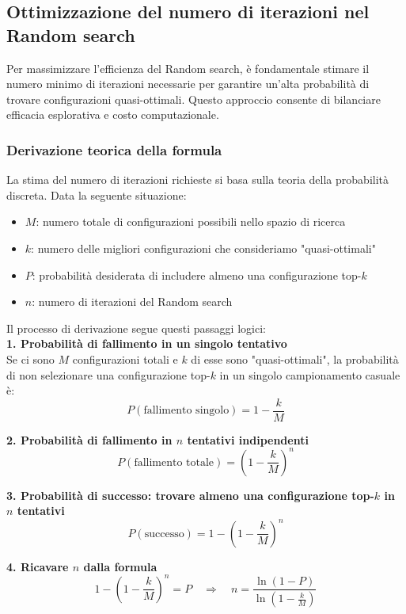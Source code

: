 \documentclass[a4paper,12pt]{report}
\begin{document}
	\subsection{Ottimizzazione del numero di iterazioni nel Random search}
	Per massimizzare l'efficienza del Random search, è fondamentale stimare il numero minimo di iterazioni necessarie per garantire un'alta probabilità di trovare configurazioni quasi-ottimali. Questo approccio consente di bilanciare efficacia esplorativa e costo computazionale.
	
	\subsubsection{Derivazione teorica della formula}
	La stima del numero di iterazioni richieste si basa sulla teoria della probabilità discreta. Data la seguente situazione:
	\begin{itemize}
		\item $M$: numero totale di configurazioni possibili nello spazio di ricerca
		\item $k$: numero delle migliori configurazioni che consideriamo "quasi-ottimali"
		\item $P$: probabilità desiderata di includere almeno una configurazione top-$k$
		\item $n$: numero di iterazioni del Random search
	\end{itemize}
	
	Il processo di derivazione segue questi passaggi logici: \\
	
	\textbf{1. Probabilità di fallimento in un singolo tentativo} \\
	Se ci sono $M$ configurazioni totali e $k$ di esse sono "quasi-ottimali", la probabilità di non selezionare una configurazione top-$k$ in un singolo campionamento casuale è:
	$$
	P(\text{fallimento singolo}) = 1 - \frac{k}{M}
	$$
	
	\textbf{2. Probabilità di fallimento in $n$ tentativi indipendenti} \\
	$$
	P(\text{fallimento totale}) = \left(1 - \frac{k}{M}\right)^n
	$$
	
	\textbf{3. Probabilità di successo: trovare almeno una configurazione top-$k$ in $n$ tentativi } \\
	$$
	P(\text{successo}) = 1 - \left(1 - \frac{k}{M}\right)^n
	$$
	
	\textbf{4. Ricavare $n$ dalla formula} \\
	$$
	1 - \left(1 - \frac{k}{M} \right)^n = P
	\quad \Longrightarrow \quad
	n = \frac{\ln(1 - P)}{\ln\left(1 - \frac{k}{M} \right)}
	$$
	
\end{document}
